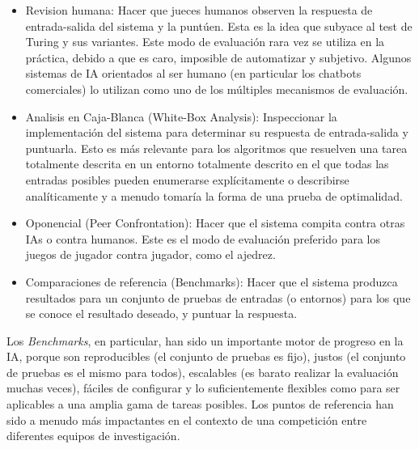\begin{itemize}
\item Revision humana: Hacer que jueces humanos observen la respuesta de entrada-salida del sistema y la puntúen. Esta es la idea que subyace al test de Turing y sus variantes. Este modo de evaluación rara vez se utiliza en la práctica, debido a que es caro, imposible de automatizar y subjetivo. Algunos sistemas de IA orientados al ser humano (en particular los chatbots comerciales) lo utilizan como uno de los múltiples mecanismos de evaluación.

\item Analisis en Caja-Blanca (White-Box Analysis): Inspeccionar la implementación del sistema para determinar su respuesta de entrada-salida y puntuarla. Esto es más relevante para los algoritmos que resuelven una tarea totalmente descrita en un entorno totalmente descrito en el que todas las entradas posibles pueden enumerarse explícitamente o describirse analíticamente y a menudo tomaría la forma de una prueba de optimalidad.

\item Oponencial (Peer Confrontation): Hacer que el sistema compita contra otras IAs o contra humanos. Este es el modo de evaluación preferido para los juegos de jugador contra jugador, como el ajedrez.

\item Comparaciones de referencia (Benchmarks): Hacer que el sistema produzca resultados para un conjunto de pruebas de entradas (o entornos) para los que se conoce el resultado deseado, y puntuar la respuesta.
\end{itemize}

Los \textit{Benchmarks}, en particular, han sido un importante motor de progreso en la IA, porque son reproducibles (el conjunto de pruebas es fijo), justos (el conjunto de pruebas es el mismo para todos), escalables (es barato realizar la evaluación muchas veces), fáciles de configurar y lo suficientemente flexibles como para ser aplicables a una amplia gama de tareas posibles. Los puntos de referencia han sido a menudo más impactantes en el contexto de una competición entre diferentes equipos de investigación.


